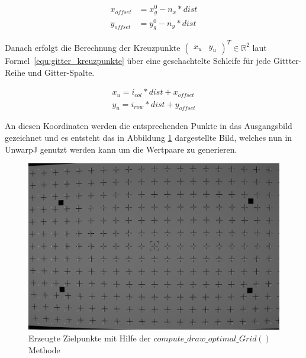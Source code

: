 \begin{equation}
\label{equ:gitter_offset}
\begin{aligned}
x_{offset} &= x_g^0 - n_x * dist\\
y_{offset} &= y_g^0 - n_y * dist
\end{aligned}
\end{equation}

Danach erfolgt die Berechnung der Kreuzpunkte $\begin{pmatrix}x_{u} & y_{u}\end{pmatrix}^T \in \mathbb{R}^2$ laut Formel~\ref{equ:gitter_kreuzpunkte} über eine geschachtelte Schleife für jede Gittter-Reihe und Gitter-Spalte. 

\begin{equation}
\label{equ:gitter_kreuzpunkte}
\begin{split}
x_{u} = i_{col} * dist + x_{offset}\\
y_{u} = i_{row} * dist + y_{offset}
\end{split}
\end{equation}

An diesen Koordinaten werden die entsprechenden Punkte in das Ausgangsbild gezeichnet und es entsteht das in Abbildung \ref{fig:gitter-optimal} dargestellte Bild, welches nun in UnwarpJ genutzt werden kann um die Wertpaare zu generieren.

\begin{figure}[H]
\includegraphics[width=\textwidth]{Images/optimales-gitter.png}
\caption{Erzeugte Zielpunkte mit Hilfe der $compute\_draw\_optimal\_Grid()$ Methode}
\label{fig:gitter-optimal}
\end{figure}

